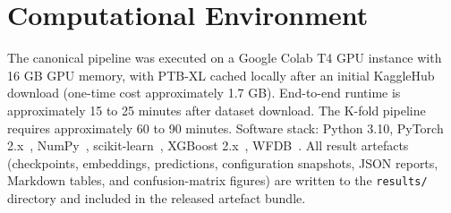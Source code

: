 \section{Computational Environment}

The canonical pipeline was executed on a Google Colab T4 GPU instance with 16 GB GPU memory, with PTB-XL cached locally after an initial KaggleHub download (one-time cost approximately 1.7 GB). End-to-end runtime is approximately 15 to 25 minutes after dataset download. The K-fold pipeline requires approximately 60 to 90 minutes. Software stack: Python 3.10, PyTorch 2.x~\cite{paszke2019pytorch}, NumPy~\cite{pedregosa2011scikit}, scikit-learn~\cite{pedregosa2011scikit}, XGBoost 2.x~\cite{chen2016xgboost}, WFDB~\cite{xie2024wfdb}. All result artefacts (checkpoints, embeddings, predictions, configuration snapshots, JSON reports, Markdown tables, and confusion-matrix figures) are written to the \texttt{results/} directory and included in the released artefact bundle.
